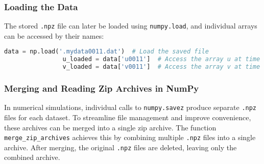 \documentclass{article}
\begin{document}
			\subsubsection{Loading the Data}
			
			The stored \texttt{.npz} file can later be loaded using \texttt{numpy.load}, and individual arrays can be accessed by their names:
			\begin{lstlisting}[language=Python]
				data = np.load('.mydata0011.dat')  # Load the saved file
				u_loaded = data['u0011']  # Access the array u at time step 11
				v_loaded = data['v0011']  # Access the array v at time step 11
			\end{lstlisting}
			
			\begin{comment}
				
			\subsubsection{Why Use \texttt{numpy.savez}?}
			
			\begin{itemize}
				\item \textbf{Efficiency}: Optimized for numerical arrays, making it faster and more efficient than general-purpose tools.
				\item \textbf{Compression}: The \texttt{.npz} format reduces file size.
				\item \textbf{Organization}: Dynamic naming conventions ensure data is stored systematically and is easy to retrieve.
				\item \textbf{Simplicity}: Saves multiple arrays in a single step without manually managing individual files.
			\end{itemize}
			content...
			\end{comment}
			
			\subsubsection{Merging and Reading Zip Archives in NumPy}
			
			In numerical simulations, individual calls to \texttt{numpy.savez} produce separate \texttt{.npz} files for each dataset. To streamline file management and improve convenience, these archives can be merged into a single zip archive. The function \texttt{merge\_zip\_archives} achieves this by combining multiple \texttt{.npz} files into a single archive. After merging, the original \texttt{.npz} files are deleted, leaving only the combined archive.
			
\end{document}
